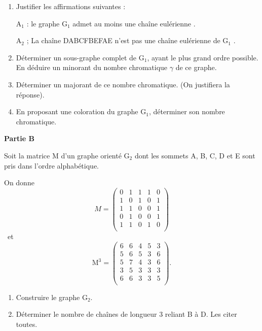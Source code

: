 \begin{enumerate}
\item Justifier les affirmations suivantes :

A$_{1}$ : \og le graphe G$_1$ admet au moins une chaîne eulérienne \fg.

A$_{2}$ ; \og La chaîne DABCFBEFAE n'est pas une chaîne eulérienne de G$_1$ \fg.

\item Déterminer un sous-graphe complet de G$_1$, ayant le plus grand ordre possible. En déduire un minorant du nombre chromatique $\gamma$ de ce graphe.

\item Déterminer un majorant de ce nombre chromatique. (On justifiera la réponse).

\item En proposant une coloration du graphe G$_1$, déterminer son nombre chromatique.

\end{enumerate}

\medskip

\textbf{Partie B}

Soit la matrice M d'un graphe orienté G$_2$ dont les sommets A, B, C, D et E sont pris dans l'ordre alphabétique.

On donne \[
    M = 
\begin{pmatrix}
    0   &   1   &   1   &   1   &   0\\
    1   &   0   &   1   &   0   &   1\\
    1   &   1   &   0   &   0   &   1\\
    0   &   1   &   0   &   0   &   1\\
    1   &   1   &   0   &   1   &   0\\
\end{pmatrix}
\]
~et~
\[
    \text{M}^3 = 
\begin{pmatrix}
    6   &   6   &   4   &   5   &   3\\
    5   &   6   &   5   &   3   &   6\\
    5   &   7   &   4   &   3   &   6\\
    3   &   5   &   3   &   3   &   3\\
    6   &   6   &   3   &   3   &   5\\
\end{pmatrix}.
\]
\begin{enumerate}
\item Construire le graphe G$_2$.
\item Déterminer le nombre de chaînes de longueur 3 reliant B à D. Les citer toutes.
\end{enumerate}

